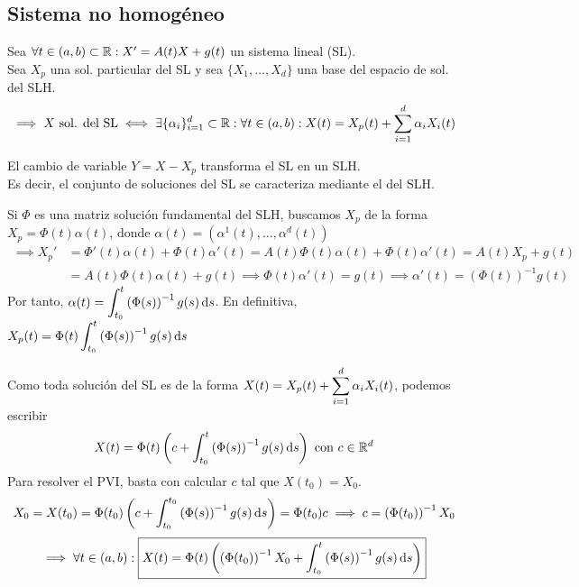\subsection{Sistema no homogéneo}

\begin{prop}
	Sea $\forall t \in (a,b) \subset \mathbb{R} : X'=A(t)X + g(t)$ un sistema lineal (SL).\\
	Sea $X_p$ una sol. particular del SL y sea $\{X_1, \dots, X_d\}$ una base del espacio de sol. del SLH.
	\[\implies X \text{ sol. del SL} \iff \exists \{\alpha_i\}_{i=1}^d \subset \mathbb{R} :\forall t \in (a, b) : X(t) = X_p(t) + \sum_{i=1}^{d} \alpha_i X_i(t)\]
	\begin{dem} %
		El cambio de variable $Y = X - X_p$ transforma el SL en un SLH. \\ Es decir, el conjunto de soluciones del SL se caracteriza mediante el del SLH.
	\end{dem}
\end{prop}


Si $\Phi$ es una matriz solución fundamental del SLH, buscamos $X_p$ de la forma $X_p = \Phi(t) \alpha(t)$, donde $\alpha(t) = \left(\alpha^1(t), \dots, \alpha^d(t)\right)$
\[\begin{aligned}
		\implies X_p' & = \Phi'(t) \alpha(t) + \Phi(t) \alpha'(t) = A(t) \Phi(t) \alpha(t) + \Phi(t) \alpha'(t) = A(t) X_p + g(t)              \\
		              & = A(t) \Phi(t) \alpha(t) + g(t) \implies \Phi(t)\alpha'(t) = g(t) \implies \alpha'(t) = \left(\Phi(t)\right)^{-1} g(t)
	\end{aligned}\]
Por tanto, $\ds \alpha(t) = \int_{t_0}^{t} \left(\Phi(s)\right)^{-1} g(s) \odif{s}$. En definitiva, $\ds X_p(t) = \Phi(t) \int_{t_0}^{t} \left(\Phi(s)\right)^{-1} g(s) \odif{s}$

Como toda solución del SL es de la forma $\displaystyle X(t) = X_p(t) + \sum_{i=1}^{d} \alpha_i X_i(t)$, podemos escribir
\[X(t) = \Phi(t) \left(c + \int_{t_0}^{t} \left(\Phi(s)\right)^{-1} g(s) \odif{s}\right) \tex{ con } c \in \R^d\]
Para resolver el PVI, basta con calcular $c$ tal que $X(t_0) = X_0$.
\[X_0 = X(t_0) = \Phi(t_0) \left(c + \int_{t_0}^{t_0} \left(\Phi(s)\right)^{-1} g(s) \odif{s}\right) = \Phi(t_0) c \implies c = \left(\Phi(t_0)\right)^{-1} X_0\]
\[\implies \forall t \in (a, b) : \boxed{X(t) = \Phi(t) \left(\left(\Phi(t_0)\right)^{-1} X_0 + \int_{t_0}^{t} \left(\Phi(s)\right)^{-1} g(s) \odif{s}\right)}\]

